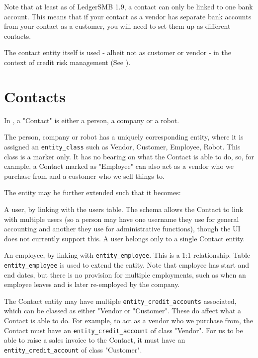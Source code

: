Note that at least as of LedgerSMB 1.9, a contact can only be linked to one bank account.  This means that if your contact as a vendor has separate bank accounts from your contact as a \gls{customer}, you will need to set them up as different contacts.

The contact entity itself is used - albeit not as customer or vendor - in the context of
credit risk management (See ).

\section{Contacts}
\label{sec-business-processes-customers-and-vendors-contacts}

In \lsmb, a "Contact" is either a person, a company or a robot.

The person, company or robot has a uniquely corresponding entity, where it is assigned an \texttt{entity\_class} such as Vendor, Customer, Employee, Robot. This class is a marker only. It has no bearing on what the Contact is able to do, so, for example, a Contact marked as "Employee" can also act as a vendor who we purchase from and a customer who we sell things to.

The entity may be further extended such that it becomes:

A \lsmb user, by linking with the users table. The schema allows the Contact to link with multiple \lsmb users (so a person may have one username they use for general accounting and another they use for administrative functions), though the UI does not currently support this. A user belongs only to a single Contact entity.

An employee, by linking with \texttt{entity\_employee}. This is a 1:1 relationship. Table \texttt{entity\_employee} is used to extend the entity. Note that employee has start and end dates, but there is no provision for multiple employments, such as when an employee leaves and is later re-employed by the company.

The Contact entity may have multiple \texttt{entity\_credit\_accounts} associated, which can be classed as either "Vendor or "Customer". These do affect what a Contact is able to do. For example, to act as a vendor who we purchase from, the Contact must have an \texttt{entity\_credit\_account} of class "Vendor". For us to be able to raise a sales invoice to the Contact, it must have an \newline\texttt{entity\_credit\_account} of class "Customer".

